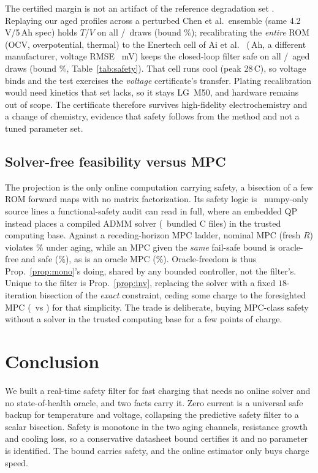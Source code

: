 \documentclass[conference]{IEEEtran}
\newcommand{\SI}[2]{#1\,#2}
\newcommand{\degreeCelsius}{\textdegree C}
\begin{document}
The certified margin is not an artifact of the reference degradation set \cite{okane2022}. Replaying our aged profiles across a perturbed
Chen et al.\ ensemble (same \SI{4.2}{V}/\SI{5}{Ah} spec) holds $T$/$V$ on all
\crossEnsSafe/\crossEnsN\ draws (bound \crossEnsCP\%); recalibrating the \emph{entire} ROM (OCV,
overpotential, thermal) to the Enertech cell of Ai et al.\ \cite{ai2020} (\SI{\chemTwoQ}{Ah}, a different manufacturer,
voltage RMSE \chemTwoV~mV) keeps the closed-loop filter safe on all \chemTwoSafe/\chemTwoN\ aged draws
(bound \chemTwoCP\%, Table~\ref{tab:safety}). That cell runs cool (peak \SI{28}{\degreeCelsius}), so
voltage binds and the test exercises the \emph{voltage} certificate's transfer. Plating recalibration
would need kinetics that set lacks, so it stays LG~M50, and hardware remains out of scope. The
certificate therefore survives high-fidelity electrochemistry and a change of chemistry, evidence that
safety follows from the method and not a tuned parameter set.

\subsection{Solver-free feasibility versus MPC}\label{sec:solver}
The projection is the only online computation carrying safety, a bisection of a few ROM forward maps
with no matrix factorization. Its safety logic is \filterSloc\ numpy-only source lines a
functional-safety audit can read in full, where an embedded QP instead places a compiled ADMM solver
(\qpTcbFiles\ bundled C files) in the trusted computing base. Against a receding-horizon MPC ladder,
nominal MPC (fresh $R$) violates \mpcNomViol\% under aging, while an MPC given the \emph{same}
fail-safe bound is oracle-free and safe (\mpcBoundedViol\%), as is an oracle MPC (\mpcOracleViol\%).
Oracle-freedom is thus Prop.~\ref{prop:mono}'s doing, shared by any bounded controller, not the
filter's. Unique to the filter is Prop.~\ref{prop:inv}, replacing the solver with a fixed
$18$-iteration bisection of the \emph{exact} constraint, ceding some charge to the foresighted MPC
(\mpcOursSoc\ vs \mpcBoundedSoc) for that simplicity. The trade is deliberate, buying MPC-class safety
without a solver in the trusted computing base for a few points of charge.

\section{Conclusion}
We built a real-time safety filter for fast charging that needs no online solver and no state-of-health
oracle, and two facts carry it. Zero current is a universal safe backup for temperature and voltage,
collapsing the predictive safety filter to a scalar bisection. Safety is monotone in the two aging
channels, resistance growth and cooling loss, so a conservative datasheet bound certifies it and no
parameter is identified. The bound carries safety, and the online estimator only buys charge speed.
\end{document}
